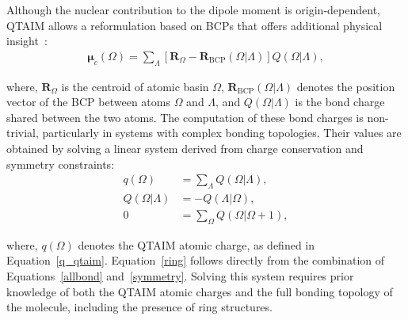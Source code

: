 {\small
{}}

Although the nuclear contribution to the dipole moment is
origin-dependent, QTAIM allows a reformulation based on
\glspl{BCP} that offers additional physical insight~\cite{Keith}:
%
\begin{align}
  \boldsymbol{\mu}_c (\Omega)= \sum_{\Lambda}[\mathbf{R}_\Omega-\mathbf{R}_\mathrm{BCP}(\Omega|\Lambda)]Q(\Omega|\Lambda),
  \label{atomic_dipole}
\end{align}

\noindent where, $\mathbf{R}_\Omega$ is the centroid of atomic basin $\Omega$, 
$\mathbf{R}_\mathrm{BCP}(\Omega|\Lambda)$ denotes the position vector of the BCP between atoms
$\Omega$ and $\Lambda$, and $Q(\Omega|\Lambda)$ is the bond charge shared
between the two atoms. The computation of these bond charges is non-trivial,
particularly in systems with complex bonding topologies. Their values are obtained
by solving a linear system derived from charge conservation and symmetry
constraints:
%
\begin{align}
  q(\Omega) &= \sum_{\Lambda} Q(\Omega|\Lambda) \label{allbond}, \\
  Q(\Omega|\Lambda) &= -Q(\Lambda|\Omega) \label{symmetry}, \\
  0 &= \sum_{\Omega} Q(\Omega|\Omega+1) \label{ring},
\end{align}

\noindent where, $q(\Omega)$ denotes the QTAIM atomic charge, as defined in
Equation~\ref{q_qtaim}. Equation~\ref{ring} follows directly from the
combination of Equations~\ref{allbond} and~\ref{symmetry}. Solving this system
requires prior knowledge of both the QTAIM atomic charges and the full bonding
topology of the molecule, including the presence of ring structures.


